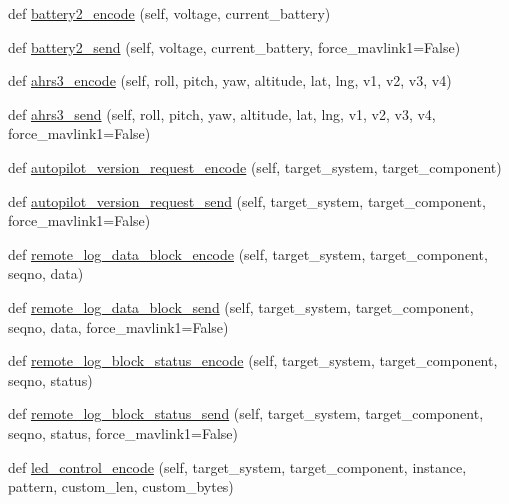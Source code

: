 \begin{DoxyCompactItemize}
\item 
def \hyperlink{classpymavlink_1_1dialects_1_1v10_1_1MAVLink_a924c3eb02cb9f1fd84c5ac841951f6e0}{battery2\+\_\+encode} (self, voltage, current\+\_\+battery)
\item 
def \hyperlink{classpymavlink_1_1dialects_1_1v10_1_1MAVLink_a0b6ba51655e34990d852b39678122e15}{battery2\+\_\+send} (self, voltage, current\+\_\+battery, force\+\_\+mavlink1=False)
\item 
def \hyperlink{classpymavlink_1_1dialects_1_1v10_1_1MAVLink_abcfbdffd76437891ab53a83c336e1f1a}{ahrs3\+\_\+encode} (self, roll, pitch, yaw, altitude, lat, lng, v1, v2, v3, v4)
\item 
def \hyperlink{classpymavlink_1_1dialects_1_1v10_1_1MAVLink_a3ca3a3b388e1c8c00e591a03418e97a7}{ahrs3\+\_\+send} (self, roll, pitch, yaw, altitude, lat, lng, v1, v2, v3, v4, force\+\_\+mavlink1=False)
\item 
def \hyperlink{classpymavlink_1_1dialects_1_1v10_1_1MAVLink_aa3ccba05a54765354981babef79475ff}{autopilot\+\_\+version\+\_\+request\+\_\+encode} (self, target\+\_\+system, target\+\_\+component)
\item 
def \hyperlink{classpymavlink_1_1dialects_1_1v10_1_1MAVLink_a850d27a8bd3013abbd260dcab586b7b9}{autopilot\+\_\+version\+\_\+request\+\_\+send} (self, target\+\_\+system, target\+\_\+component, force\+\_\+mavlink1=False)
\item 
def \hyperlink{classpymavlink_1_1dialects_1_1v10_1_1MAVLink_ab55b42d3b2f3e0b3c490b0dac3011edf}{remote\+\_\+log\+\_\+data\+\_\+block\+\_\+encode} (self, target\+\_\+system, target\+\_\+component, seqno, data)
\item 
def \hyperlink{classpymavlink_1_1dialects_1_1v10_1_1MAVLink_a208b5a1138e0916cf55eaf441b4624b6}{remote\+\_\+log\+\_\+data\+\_\+block\+\_\+send} (self, target\+\_\+system, target\+\_\+component, seqno, data, force\+\_\+mavlink1=False)
\item 
def \hyperlink{classpymavlink_1_1dialects_1_1v10_1_1MAVLink_a9412e4d41384ea295826e8086156f5c4}{remote\+\_\+log\+\_\+block\+\_\+status\+\_\+encode} (self, target\+\_\+system, target\+\_\+component, seqno, status)
\item 
def \hyperlink{classpymavlink_1_1dialects_1_1v10_1_1MAVLink_ace5e839951feb51db7520922eb0700c9}{remote\+\_\+log\+\_\+block\+\_\+status\+\_\+send} (self, target\+\_\+system, target\+\_\+component, seqno, status, force\+\_\+mavlink1=False)
\item 
def \hyperlink{classpymavlink_1_1dialects_1_1v10_1_1MAVLink_a9e85805885773cc313980301fca85957}{led\+\_\+control\+\_\+encode} (self, target\+\_\+system, target\+\_\+component, instance, pattern, custom\+\_\+len, custom\+\_\+bytes)

\end{DoxyCompactItemize}
